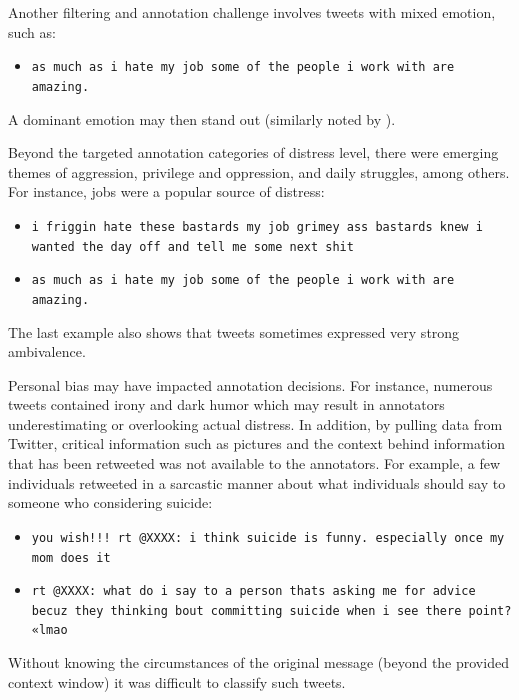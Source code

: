 \documentclass[11pt]{article}
\begin{document}
Another filtering and annotation challenge involves tweets with mixed emotion, such as:

\begin{itemize}
\footnotesize
\item \texttt{as much as i hate my job some of the people i work with are amazing.}
\end{itemize}


A dominant emotion may then stand out (similarly noted by ).

Beyond the targeted annotation categories of distress level, there were emerging themes of aggression, privilege and oppression, and daily struggles, among others.  For instance, jobs were a popular source of distress:

\begin{itemize}
\footnotesize
\item \texttt{i friggin hate these bastards \@ my job grimey ass bastards knew i wanted the day off and tell me some next shit}
\item \texttt{as much as i hate my job some of the people i work with are amazing.}
\end{itemize}

The last example also shows that tweets sometimes expressed very strong ambivalence.

Personal bias may have impacted annotation decisions. For instance, numerous tweets contained irony and dark humor which may result in annotators underestimating or overlooking actual distress. In addition, by pulling data from Twitter, critical information such as pictures and the context behind information that has been retweeted was not available to the annotators.  For example, a few individuals retweeted in a sarcastic manner about what individuals should say to someone who considering suicide:

\begin{itemize}
\footnotesize
\item \texttt{you wish!!! rt @XXXX: i think suicide is funny. especially once my mom does it}
\item \texttt{rt @XXXX: what do i say to a person thats asking me for advice becuz they thinking bout committing suicide when i see there point? «lmao}
\end{itemize}
Without knowing the circumstances of the original message (beyond the provided context window) it was difficult to classify such tweets.  %
\end{document}
